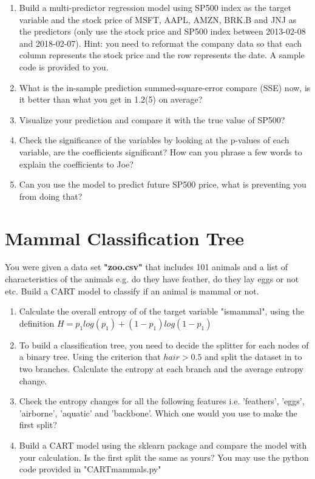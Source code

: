 \documentclass{article}
\begin{document}
\begin{enumerate}[(1)]
\item Build a multi-predictor regression model using SP500 index as the target variable and the stock price of MSFT, AAPL, AMZN, BRK.B and JNJ as the predictors (only use the stock price and SP500 index between 2013-02-08 and 2018-02-07). Hint: you need to reformat the company data so that each column represents the stock price and the row represents the date. A sample code is provided to you.
\item What is the in-sample prediction summed-square-error compare (SSE) now, is it better than what you get in 1.2(5) on average?
\item Visualize your prediction and compare it with the true value of SP500?
\item Check the significance of the variables by looking at the p-values of each variable, are the coefficients significant? How can you phrase a few words to explain the coefficients to Joe?
\item Can you use the model to predict future SP500 price, what is preventing you from doing that?
\end{enumerate}

\section{Mammal Classification Tree}
You were given a data set \textbf{"zoo.csv"} that includes 101 animals and a list of characteristics of the animals e.g. do they have feather, do they lay eggs or not etc. Build a CART model to classify if an animal is mammal or not.

\begin{enumerate}[(1)]
\item Calculate the overall entropy of of the target variable "ismammal", using the definition $H=p_1 log(p_1)+(1-p_1) log(1-p_1)$
\item To build a classification tree, you need to decide the splitter for each nodes of a binary tree. Using the criterion that $hair>0.5$ and split the dataset in to two branches. Calculate the entropy at each branch and the average entropy change.
\item Check the entropy changes for all the following features i.e. 'feathers', 'eggs', 'airborne', 'aquatic' and 'backbone'. Which one would you use to make the first split?
\item Build a CART model using the sklearn package and compare the model with your calculation. Is the first split the same as yours? You may use the python code provided in "CARTmammals.py"

\end{enumerate}
\end{document}
